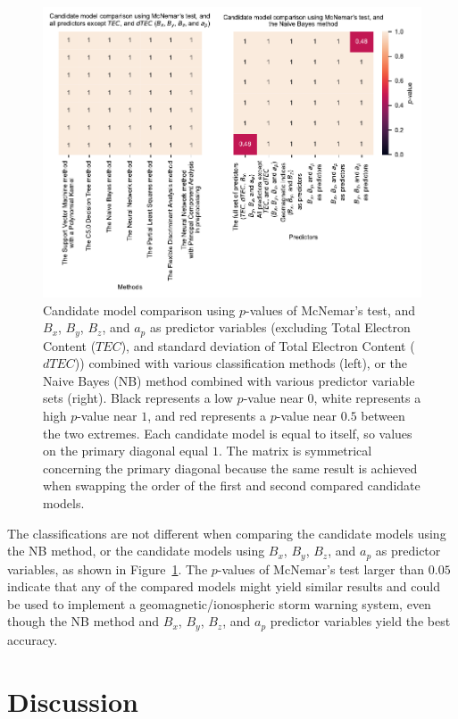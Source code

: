 \let\LaTeXcline\cline\documentclass[sn-mathphys-num]{sn-jnl}\let\cline\LaTeXcline
\begin{document}
\begin{figure}[!ht]
 \centering
    \includegraphics[width=\linewidth]{pvalueplot_total_horizontal.pdf}
    \caption{Candidate model comparison using $p$-values of McNemar's test, and $B_{x}$, $B_{y}$, $B_{z}$, and $a_{p}$ as predictor variables (excluding Total Electron Content ($TEC$), and standard deviation of Total Electron Content ($dTEC$)) combined with various classification methods (left), or the Naive Bayes (NB) method combined with various predictor variable sets (right). Black represents a low $p$-value near $0$, white represents a high $p$-value near $1$, and red represents a $p$-value near $0.5$ between the two extremes. Each candidate model is equal to itself, so values on the primary diagonal equal $1$. The matrix is symmetrical concerning the primary diagonal because the same result is achieved when swapping the order of the first and second compared candidate models.}
    \label{fig:pvalueplot}
\end{figure}

The classifications are not different when comparing the candidate models using the NB method, or the candidate models using $B_{x}$, $B_{y}$, $B_{z}$, and $a_{p}$ as predictor variables, as shown in Figure~\ref{fig:pvalueplot}. The $p$-values of McNemar's test larger than $0.05$ indicate that any of the compared models might yield similar results and could be used to implement a geomagnetic/ionospheric storm warning system, even though the NB method and $B_{x}$, $B_{y}$, $B_{z}$, and $a_{p}$  predictor variables yield the best accuracy.

\section{Discussion}
\label{sec:Discussion}
\end{document}
